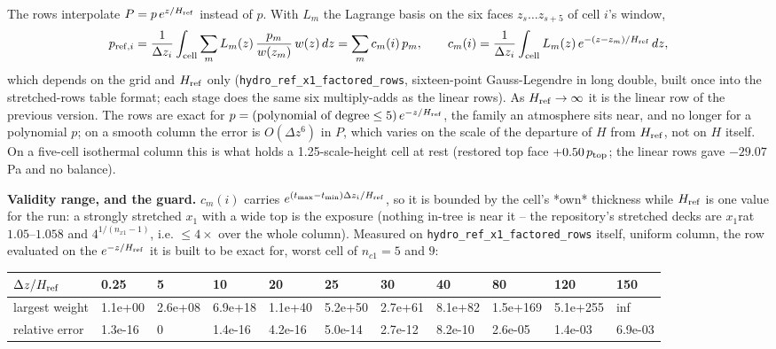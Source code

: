 \documentclass[11pt,a4paper]{article}
\begin{document}
The rows interpolate $P = p\,e^{z/H_{\rm ref}}$ instead of $p$. With $L_m$ the Lagrange basis on the six faces
$z_s \ldots z_{s+5}$ of cell $i$'s window,
\begin{equation*}
p_{{\rm ref},i} = \frac{1}{\Delta z_i}\int_{\rm cell}\sum_m L_m(z)\,\frac{p_m}{w(z_m)}\,w(z)\,dz
               = \sum_m c_m(i)\,p_m, \qquad
c_m(i) = \frac{1}{\Delta z_i}\int_{\rm cell} L_m(z)\,e^{-(z - z_m)/H_{\rm ref}}\,dz ,
\end{equation*}
which depends on the grid and $H_{\rm ref}$ only (\texttt{hydro\_ref\_x1\_factored\_rows}, sixteen-point
Gauss-Legendre in long double, built once into the stretched-rows table format; each stage does the same
six multiply-adds as the linear rows). As $H_{\rm ref} \to \infty$ it is the linear row of the previous
version. The rows are exact for $p = (\text{polynomial of degree} \le 5)\,e^{-z/H_{\rm ref}}$, the family an
atmosphere sits near, and no longer for a polynomial $p$; on a smooth column the error is $O(\Delta z^6)$ in
$P$, which varies on the scale of the departure of $H$ from $H_{\rm ref}$, not on $H$ itself. On a five-cell
isothermal column this is what holds a 1.25-scale-height cell at rest (restored top face $+0.50\,p_{\rm top}$;
the linear rows gave $-29.07$ Pa and no balance).

\textbf{Validity range, and the guard.} $c_m(i)$ carries $e^{(t_{\max} - t_{\min})\Delta z_i/H_{\rm ref}}$, so it is
bounded by the cell's *own* thickness while $H_{\rm ref}$ is one value for the run: a strongly stretched $x_1$
with a wide top is the exposure (nothing in-tree is near it -- the repository's stretched decks are
$x_{1}$rat $1.05$–$1.058$ and $4^{1/(n_{x1}-1)}$, i.e. $\le 4\times$ over the whole column). Measured on
\texttt{hydro\_ref\_x1\_factored\_rows} itself, uniform column, the row evaluated on the $e^{-z/H_{\rm ref}}$ it is built
to be exact for, worst cell of $n_{c1} = 5$ and $9$:

\begin{longtable}{lllllllllll}
\toprule
$\Delta z/H_{\rm ref}$ & 0.25 & 5 & 10 & 20 & 25 & 30 & 40 & 80 & 120 & 150 \\
\midrule
largest weight & 1.1e+00 & 2.6e+08 & 6.9e+18 & 1.1e+40 & 5.2e+50 & 2.7e+61 & 8.1e+82 & 1.5e+169 & 5.1e+255 & inf \\
relative error & 1.3e-16 & 0 & 1.4e-16 & 4.2e-16 & 5.0e-14 & 2.7e-12 & 8.2e-10 & 2.6e-05 & 1.4e-03 & 6.9e-03 \\
\bottomrule
\end{longtable}
\end{document}
